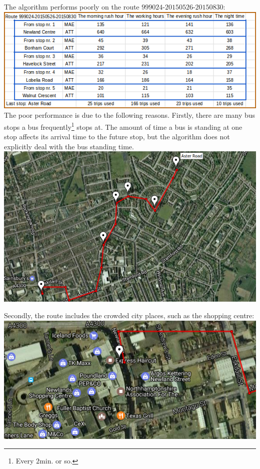 \documentclass[12pt,a4paper,oneside,openright]{report}
\begin{document}
The algorithm performs poorly on the route $999024$-$20150526$-$20150830$: \\

\includegraphics[width=\textwidth]{figs/table_of_999024.png} \\

The poor performance is due to the following reasons. Firstly, there are many bus stops a bus
frequently\footnote{Every $2$min. or so.} stops at. The amount of time a bus is standing at one
stop affects its arrival time to the future stop, but the algorithm does not explicitly deal with
the bus standing time. \\

\includegraphics[scale=0.8]{figs/worst_route.png} \\

\newpage

Secondly, the route includes the crowded city places, such as the shopping centre: \\

\includegraphics[scale=0.6]{figs/shopping_centre.png} \\
\end{document}
